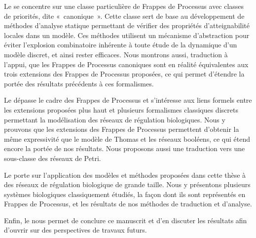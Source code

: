 Le  se concentre sur une classe particulière de Frappes de Processus avec classes
de priorités, dite «~canonique~».
Cette classe sert de base au développement de méthodes d'analyse statique permettant
de vérifier des propriétés d'atteignabilité locales dans un modèle.
Ces méthodes utilisent un mécanisme d'abstraction pour éviter l'explosion combinatoire
inhérente à toute étude de la dynamique d'un modèle discret, et ainsi rester efficaces.
Nous montrons aussi, traduction à l'appui,
que les Frappes de Processus canoniques sont en réalité équivalentes
aux trois extensions des Frappes de Processus proposées,
ce qui permet d'étendre la portée des résultats précédents à ces formalismes.

Le  dépasse le cadre des Frappes de Processus et s'intéresse aux liens
formels entre les extensions proposées plus haut et plusieurs formalismes classiques discrets
permettant la modélisation des réseaux de régulation biologiques.
Nous y prouvons que les extensions des Frappes de Processus permettent d'obtenir la même
expressivité que le modèle de Thomas et les réseaux booléens,
ce qui étend encore la portée de nos résultats.
Nous proposons aussi une traduction vers une sous-classe des réseaux de Petri.

Le  porte sur l'application des modèles et méthodes proposées
dans cette thèse à des réseaux de régulation biologique de grande taille.
Nous y présentons plusieurs systèmes biologiques classiquement étudiés,
la façon dont ils sont représentés en Frappes de Processus,
et les résultats de nos méthodes de traduction et d'analyse.

Enfin, le  nous permet de conclure ce manuscrit
et d'en discuter les résultats afin d'ouvrir sur des perspectives de travaux futurs.
